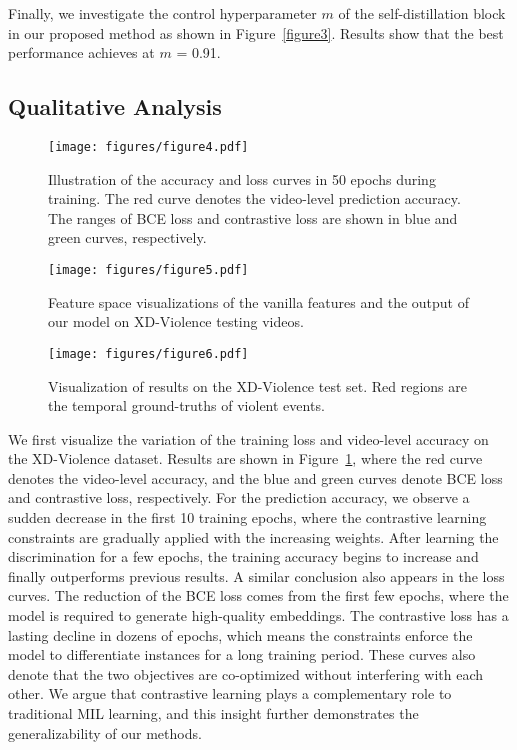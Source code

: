 \documentclass[sigconf]{acmart}
\begin{document}
Finally, we investigate the control hyperparameter $m$ of the self-distillation block in our proposed method as shown in Figure~\ref{figure3}. Results show that the best performance achieves at $m$ = 0.91.

\subsection{Qualitative Analysis}

\begin{figure}[tb]
\centering
\texttt{[image: figures/figure4.pdf]}
\vspace{-2mm}
\caption{Illustration of the accuracy and loss curves in 50 epochs during training. The red curve denotes the video-level prediction accuracy. The ranges of BCE loss and contrastive loss are shown in blue and green curves, respectively.}
\vspace{-2mm}
\label{figure4}
\end{figure}

\begin{figure}[tb]
\centering
\texttt{[image: figures/figure5.pdf]}
\vspace{-2mm}
\caption{Feature space visualizations of the vanilla features and the output of our model on XD-Violence testing videos.}
\vspace{-2mm}
\label{figure5}
\end{figure}

\begin{figure*}[htbp]
\centering
\texttt{[image: figures/figure6.pdf]}
\vspace{-2mm}
\caption{Visualization of results on the XD-Violence test set. Red regions are the temporal ground-truths of violent events.}
\vspace{-3mm}
\label{figure6}
\end{figure*}

We first visualize the variation of the training loss and video-level accuracy on the XD-Violence dataset. Results are shown in Figure~\ref{figure4}, where the red curve denotes the video-level accuracy, and the blue and green curves denote BCE loss and contrastive loss, respectively. For the prediction accuracy, we observe a sudden decrease in the first 10 training epochs, where the contrastive learning constraints are gradually applied with the increasing weights. After learning the discrimination for a few epochs, the training accuracy begins to increase and finally outperforms previous results. A similar conclusion also appears in the loss curves. The reduction of the BCE loss comes from the first few epochs, where the model is required to generate high-quality embeddings. The contrastive loss has a lasting decline in dozens of epochs, which means the constraints enforce the model to differentiate instances for a long training period. These curves also denote that the two objectives are co-optimized without interfering with each other. We argue that contrastive learning plays a complementary role to traditional MIL learning, and this insight further demonstrates the generalizability of our methods.
\end{document}
